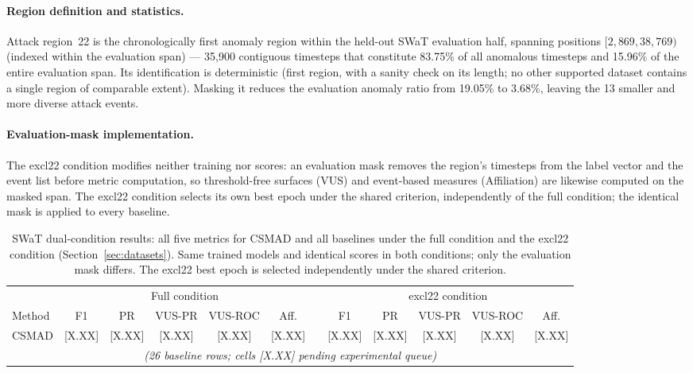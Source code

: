 \paragraph{Region definition and statistics.}
Attack region~22 is the chronologically first anomaly region within the held-out SWaT evaluation
half, spanning positions $[2{,}869, 38{,}769)$ (indexed within the evaluation span) --- 35,900
contiguous timesteps that constitute 83.75\% of all anomalous timesteps and 15.96\% of the
entire evaluation span.
Its identification is deterministic (first region, with a sanity check on its length; no other
supported dataset contains a single region of comparable extent).
Masking it reduces the evaluation anomaly ratio from 19.05\% to 3.68\%, leaving the 13 smaller
and more diverse attack events.

\paragraph{Evaluation-mask implementation.}
The excl22 condition modifies neither training nor scores: an evaluation mask removes the
region's timesteps from the label vector and the event list before metric computation, so
threshold-free surfaces (VUS) and event-based measures (Affiliation) are likewise computed on
the masked span.
The excl22 condition selects its own best epoch under the shared criterion, independently of
the full condition; the identical mask is applied to every baseline.

\begin{table}[tp]
\footnotesize
\centering
\caption{SWaT dual-condition results: all five metrics for CSMAD and all baselines under the
  full condition and the excl22 condition (Section~\ref{sec:datasets}).
  Same trained models and identical scores in both conditions; only the evaluation mask differs.
  The excl22 best epoch is selected independently under the shared criterion.}
\label{tab:swat_dual}
\setlength{\tabcolsep}{3pt}
\begin{adjustbox}{max width=\linewidth}
\begin{tabular}{lccccccccccc}
\toprule
& \multicolumn{5}{c}{Full condition} & & \multicolumn{5}{c}{excl22 condition} \\
\cmidrule(lr){2-6}\cmidrule(lr){8-12}
Method & F1 & PR & VUS-PR & VUS-ROC & Aff. & & F1 & PR & VUS-PR & VUS-ROC & Aff. \\
\midrule
CSMAD      & {[X.XX]} & {[X.XX]} & {[X.XX]} & {[X.XX]} & {[X.XX]} & & {[X.XX]} & {[X.XX]} & {[X.XX]} & {[X.XX]} & {[X.XX]} \\
\multicolumn{12}{c}{\textit{(26 baseline rows; cells {[X.XX]} pending experimental queue)}} \\
\bottomrule
\end{tabular}
\end{adjustbox}
\end{table}

